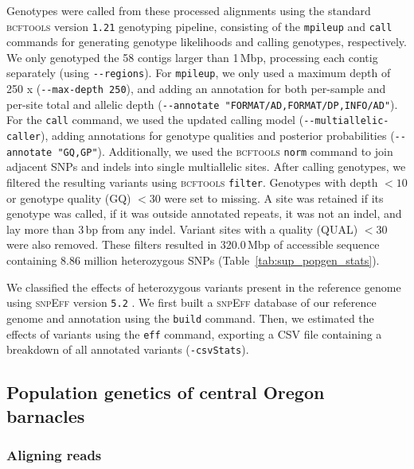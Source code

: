 Genotypes were called from these processed alignments using the standard \textsc{bcftools} version
\texttt{1.21} \citep{danecek_bcftools_2021} genotyping pipeline, consisting of the
\texttt{mpileup} and \texttt{call} commands for generating genotype likelihoods and calling
genotypes, respectively.
We only genotyped the 58 contigs larger than 1\,Mbp, processing each contig separately
(using \texttt{-{}-regions}).
For \texttt{mpileup}, we only used a maximum depth of 250 x (\texttt{-{}-max-depth 250}),
and adding an annotation for both per-sample and per-site total and allelic depth
(\texttt{-{}-annotate "FORMAT/AD,FORMAT/DP,INFO/AD"}).
For the \texttt{call} command, we used the updated calling model
(\texttt{-{}-multiallelic-caller}), adding annotations for genotype qualities and posterior
probabilities (\texttt{-{}-annotate "GQ,GP"}).
Additionally, we used the \textsc{bcftools} \texttt{norm} command to join adjacent SNPs
and indels into single multiallelic sites.
After calling genotypes, we filtered the resulting variants using \textsc{bcftools}
\texttt{filter}.
Genotypes with depth $<10$ or genotype quality (GQ) $<30$ were set to missing.
A site was retained if its genotype was called, if it was outside annotated repeats,
it was not an indel, and lay more than 3\,bp from any indel.
Variant sites with a quality (QUAL) $<30$ were also removed.
These filters resulted in 320.0\,Mbp of accessible sequence containing 8.86 million
heterozygous SNPs (Table~\ref{tab:sup_popgen_stats}). 
\vspace{0.1cm}

We classified the effects of heterozygous variants present in the reference genome using
\textsc{snpEff} version \texttt{5.2} \citep{cingolani_program_2012}.
We first built a \textsc{snpEff} database of our \bgla{} reference genome and annotation
using the \texttt{build} command.
Then, we estimated the effects of variants using the \texttt{eff} command, exporting a
CSV file containing a breakdown of all annotated variants (\texttt{-csvStats}).

\subsection*{Population genetics of central Oregon barnacles}\label{sec:methods_popgen}

\subsubsection*{Aligning reads}

